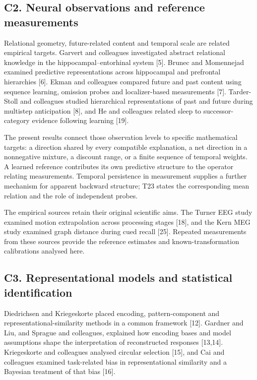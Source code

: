 \documentclass[11pt,a4paper]{article}
\begin{document}
\subsection{C2. Neural observations and reference
measurements}\label{c2.-neural-observations-and-reference-measurements}

Relational geometry, future-related content and temporal scale are
related empirical targets. Garvert and colleagues investigated abstract
relational knowledge in the hippocampal–entorhinal system {[}5{]}.
Brunec and Momennejad examined predictive representations across
hippocampal and prefrontal hierarchies {[}6{]}. Ekman and colleagues
compared future and past content using sequence learning, omission
probes and localizer-based measurements {[}7{]}. Tarder-Stoll and
colleagues studied hierarchical representations of past and future
during multistep anticipation {[}8{]}, and He and colleagues related
sleep to successor-category evidence following learning {[}19{]}.

The present results connect those observation levels to specific
mathematical targets: a direction shared by every compatible
explanation, a net direction in a nonnegative mixture, a discount range,
or a finite sequence of temporal weights. A learned reference
contributes its own predictive structure to the operator relating
measurements. Temporal persistence in measurement supplies a further
mechanism for apparent backward structure; T23 states the corresponding
mean relation and the role of independent probes.

The empirical sources retain their original scientific aims. The Turner
EEG study examined motion extrapolation across processing stages
{[}18{]}, and the Kern MEG study examined graph distance during cued
recall {[}25{]}. Repeated measurements from these sources provide the
reference estimates and known-transformation calibrations analysed here.

\subsection{C3. Representational models and statistical
identification}\label{c3.-representational-models-and-statistical-identification}

Diedrichsen and Kriegeskorte placed encoding, pattern-component and
representational-similarity methods in a common framework {[}12{]}.
Gardner and Liu, and Sprague and colleagues, explained how encoding
bases and model assumptions shape the interpretation of reconstructed
responses {[}13,14{]}. Kriegeskorte and colleagues analysed circular
selection {[}15{]}, and Cai and colleagues examined task-related bias in
representational similarity and a Bayesian treatment of that bias
{[}16{]}.
\end{document}
